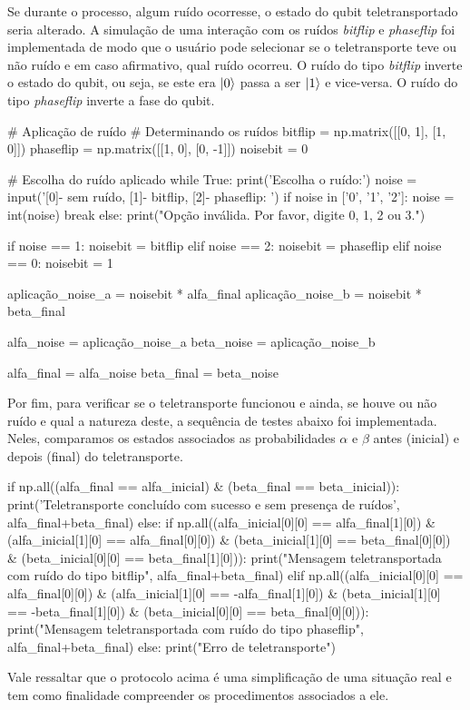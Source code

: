 Se durante o processo, algum ruído ocorresse, o estado do qubit teletransportado seria alterado. A simulação de uma interação com os ruídos \emph{bitflip} e \emph{phaseflip} foi implementada de modo que o usuário pode selecionar se o teletransporte teve ou não ruído e em caso afirmativo, qual ruído ocorreu. O ruído do tipo \emph{bitflip} inverte o estado do qubit, ou seja, se este era \(\ket{0}\) passa a ser \(\ket{1}\) e vice-versa. O ruído do tipo \emph{phaseflip} inverte a fase do qubit.

\begin{pycode}
    # Aplicação de ruído
    # Determinando os ruídos
    bitflip = np.matrix([[0, 1], [1, 0]])
    phaseflip = np.matrix([[1, 0], [0, -1]])
    noisebit = 0

    # Escolha do ruído aplicado
    while True:
        print('Escolha o ruído:')
        noise = input('[0]- sem ruído, [1]- bitflip, [2]- phaseflip: ')
        if noise in ['0', '1', '2']:
            noise = int(noise)
            break
        else:
            print("Opção inválida. Por favor, digite 0, 1, 2 ou 3.")

    if noise == 1:
        noisebit = bitflip
    elif noise == 2:
        noisebit = phaseflip
    elif noise == 0:
        noisebit = 1

    aplicação_noise_a = noisebit * alfa_final
    aplicação_noise_b = noisebit * beta_final

    alfa_noise = aplicação_noise_a
    beta_noise = aplicação_noise_b

    alfa_final = alfa_noise
    beta_final = beta_noise
\end{pycode}

Por fim, para verificar se o teletransporte funcionou e ainda, se houve ou não ruído e qual a natureza deste, a sequência de testes abaixo foi implementada. Neles, comparamos os estados associados as probabilidades \(\alpha\) e \(\beta\) antes (inicial) e depois (final) do teletransporte.

\begin{pycode}
    if np.all((alfa_final == alfa_inicial) & (beta_final == beta_inicial)):
        print('Teletransporte concluído com sucesso e sem presença de ruídos', alfa_final+beta_final)
    else:
        if np.all((alfa_inicial[0][0] == alfa_final[1][0]) &
                    (alfa_inicial[1][0] == alfa_final[0][0]) &
                    (beta_inicial[1][0] == beta_final[0][0]) &
                    (beta_inicial[0][0] == beta_final[1][0])):
            print("Mensagem teletransportada com ruído do tipo bitflip", alfa_final+beta_final)
        elif np.all((alfa_inicial[0][0] == alfa_final[0][0]) &
                    (alfa_inicial[1][0] == -alfa_final[1][0]) &
                    (beta_inicial[1][0] == -beta_final[1][0]) &
                    (beta_inicial[0][0] == beta_final[0][0])):
            print("Mensagem teletransportada com ruído do tipo phaseflip", alfa_final+beta_final)
        else:
            print("Erro de teletransporte")
\end{pycode}

Vale ressaltar que o protocolo acima é uma simplificação de uma situação real e tem como finalidade compreender os procedimentos associados a ele.
